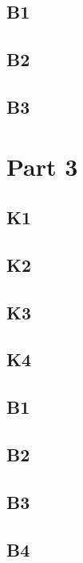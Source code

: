 \documentclass[10pt,a4paper]{article}
\begin{document}
\subsection{B1}

\subsection{B2}

\subsection{B3}

\section{Part 3}
\subsection{K1}

\subsection{K2}

\subsection{K3}

\subsection{K4}

\subsection{B1}

\subsection{B2}

\subsection{B3}

\subsection{B4}
\end{document}
